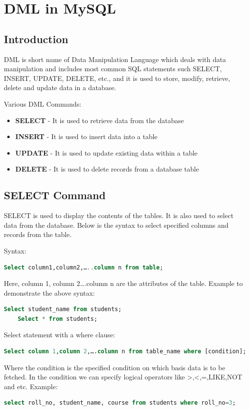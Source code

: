 \chapter{DML in MySQL}
\section{Introduction}
DML is short name of Data Manipulation Language which deals with data manipulation and includes most common SQL statements such SELECT, INSERT, UPDATE, DELETE, etc., and it is used to store, modify, retrieve, delete and update data in a database.

Various DML Commands:
\begin{itemize}
	\tightlist
	\item \textbf{SELECT} - It is used to retrieve data from the database
	\item \textbf{INSERT} - It is used to insert data into a table
	\item \textbf{UPDATE} - It is used to update existing data within a table
	\item \textbf{DELETE} - It is used to delete records from a database table
\end{itemize}

\section{SELECT Command}
SELECT is used to display the contents of the tables. It is also used to select data from the database. Below is the syntax to select specified columns and records from the table.

Syntax: 
\begin{lstlisting}[language=sql]
	Select column1,column2,…..column n from table;	
\end{lstlisting}
Here, column 1, column 2….column n are the attributes of the table.
Example to demonstrate the above syntax:
\begin{lstlisting}[language=sql]
	Select student_name from students;
	Select * from students;
\end{lstlisting}

Select statement with a where clause:
\begin{lstlisting}[language=sql]
	Select column 1,column 2,….column n from table_name where [condition];
\end{lstlisting}
Where the condition is the specified condition on which basis data is to be fetched. In the condition we can specify logical operators like >,<,=,LIKE,NOT and etc.
Example:
\begin{lstlisting}[language=sql]
	select roll_no, student_name, course from students where roll_no=3;
\end{lstlisting}

